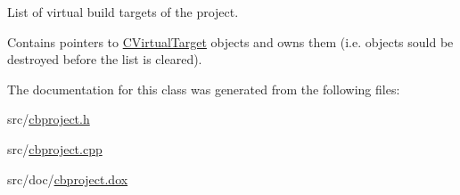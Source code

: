 List of virtual build targets of the project. 

Contains pointers to \hyperlink{classCVirtualTarget}{C\-Virtual\-Target} objects and owns them (i.\-e. objects sould be destroyed before the list is cleared). 

The documentation for this class was generated from the following files\-:\begin{DoxyCompactItemize}
\item 
src/\hyperlink{cbproject_8h}{cbproject.\-h}\item 
src/\hyperlink{cbproject_8cpp}{cbproject.\-cpp}\item 
src/doc/\hyperlink{cbproject_8dox}{cbproject.\-dox}\end{DoxyCompactItemize}
